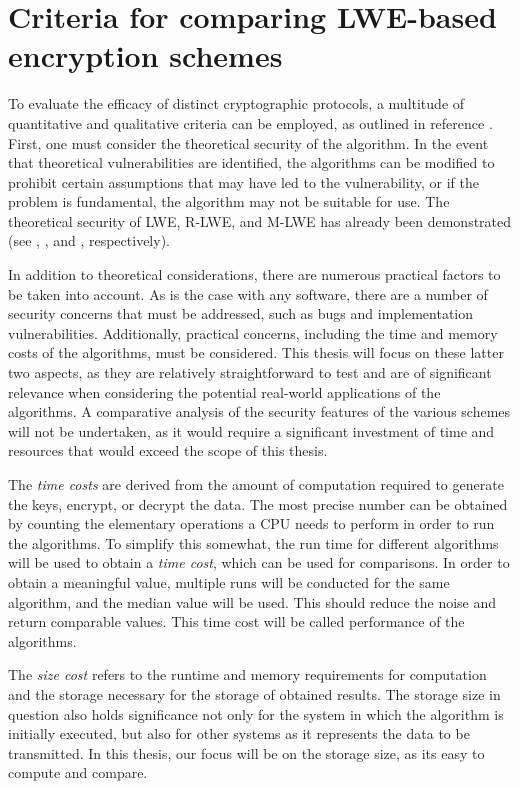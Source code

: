\section{Criteria for comparing LWE-based encryption schemes}
\label{sec:LweComparisonCriteria}

To evaluate the efficacy of distinct cryptographic protocols, a multitude of quantitative and qualitative criteria can be employed, as outlined in reference \cite{CryptoMetrics}. First, one must consider the theoretical security of the algorithm. In the event that theoretical vulnerabilities are identified, the algorithms can be modified to prohibit certain assumptions that may have led to the vulnerability, or if the problem is fundamental, the algorithm may not be suitable for use. The theoretical security of LWE, R-LWE, and M-LWE has already been demonstrated (see \cite{Regev2005OnLL}, \cite{RLWEproof}, and \cite{MLWEproof}, respectively).

In addition to theoretical considerations, there are numerous practical factors to be taken into account. As is the case with any software, there are a number of security concerns that must be addressed, such as bugs and implementation vulnerabilities. Additionally, practical concerns, including the time and memory costs of the algorithms, must be considered. This thesis will focus on these latter two aspects, as they are relatively straightforward to test and are of significant relevance when considering the potential real-world applications of the algorithms. A comparative analysis of the security features of the various schemes will not be undertaken, as it would require a significant investment of time and resources that would exceed the scope of this thesis.

The \textit{time costs} are derived from the amount of computation required to generate the keys, encrypt, or decrypt the data. The most precise number can be obtained by counting the elementary operations a CPU needs to perform in order to run the algorithms. To simplify this somewhat, the run time for different algorithms will be used to obtain a \textit{time cost}, which can be used for comparisons. In order to obtain a meaningful value, multiple runs will be conducted for the same algorithm, and the median value will be used. This should reduce the noise and return comparable values. This time cost will be called performance of the algorithms.

The \textit{size cost} refers to the runtime and memory requirements for computation and the storage necessary for the storage of obtained results. The storage size in question also holds significance not only for the system in which the algorithm is initially executed, but also for other systems as it represents the data to be transmitted. In this thesis, our focus will be on the storage size, as its easy to compute and compare.

